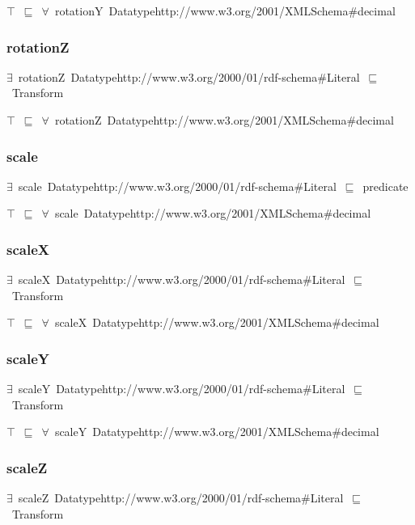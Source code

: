 \documentclass{article}
\begin{document}
\ensuremath{\top}~\ensuremath{\sqsubseteq}~\ensuremath{\forall}~rotationY~Datatypehttp://www.w3.org/2001/XMLSchema#decimal

\subsubsection*{rotationZ}

\ensuremath{\exists}~rotationZ~Datatypehttp://www.w3.org/2000/01/rdf-schema#Literal~\ensuremath{\sqsubseteq}~Transform

\ensuremath{\top}~\ensuremath{\sqsubseteq}~\ensuremath{\forall}~rotationZ~Datatypehttp://www.w3.org/2001/XMLSchema#decimal

\subsubsection*{scale}

\ensuremath{\exists}~scale~Datatypehttp://www.w3.org/2000/01/rdf-schema#Literal~\ensuremath{\sqsubseteq}~predicate

\ensuremath{\top}~\ensuremath{\sqsubseteq}~\ensuremath{\forall}~scale~Datatypehttp://www.w3.org/2001/XMLSchema#decimal

\subsubsection*{scaleX}

\ensuremath{\exists}~scaleX~Datatypehttp://www.w3.org/2000/01/rdf-schema#Literal~\ensuremath{\sqsubseteq}~Transform

\ensuremath{\top}~\ensuremath{\sqsubseteq}~\ensuremath{\forall}~scaleX~Datatypehttp://www.w3.org/2001/XMLSchema#decimal

\subsubsection*{scaleY}

\ensuremath{\exists}~scaleY~Datatypehttp://www.w3.org/2000/01/rdf-schema#Literal~\ensuremath{\sqsubseteq}~Transform

\ensuremath{\top}~\ensuremath{\sqsubseteq}~\ensuremath{\forall}~scaleY~Datatypehttp://www.w3.org/2001/XMLSchema#decimal

\subsubsection*{scaleZ}

\ensuremath{\exists}~scaleZ~Datatypehttp://www.w3.org/2000/01/rdf-schema#Literal~\ensuremath{\sqsubseteq}~Transform
\end{document}
